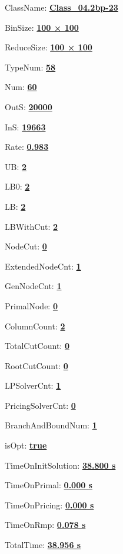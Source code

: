 \documentclass[11pt]{article}
\begin{document}
\pagestyle{empty}


ClassName: \underline{\textbf{Class_04.2bp-23}}
\par
BinSize: \underline{\textbf{100 × 100}}
\par
ReduceSize: \underline{\textbf{100 × 100}}
\par
TypeNum: \underline{\textbf{58}}
\par
Num: \underline{\textbf{60}}
\par
OutS: \underline{\textbf{20000}}
\par
InS: \underline{\textbf{19663}}
\par
Rate: \underline{\textbf{0.983}}
\par
UB: \underline{\textbf{2}}
\par
LB0: \underline{\textbf{2}}
\par
LB: \underline{\textbf{2}}
\par
LBWithCut: \underline{\textbf{2}}
\par
NodeCut: \underline{\textbf{0}}
\par
ExtendedNodeCnt: \underline{\textbf{1}}
\par
GenNodeCnt: \underline{\textbf{1}}
\par
PrimalNode: \underline{\textbf{0}}
\par
ColumnCount: \underline{\textbf{2}}
\par
TotalCutCount: \underline{\textbf{0}}
\par
RootCutCount: \underline{\textbf{0}}
\par
LPSolverCnt: \underline{\textbf{1}}
\par
PricingSolverCnt: \underline{\textbf{0}}
\par
BranchAndBoundNum: \underline{\textbf{1}}
\par
isOpt: \underline{\textbf{true}}
\par
TimeOnInitSolution: \underline{\textbf{38.800 s}}
\par
TimeOnPrimal: \underline{\textbf{0.000 s}}
\par
TimeOnPricing: \underline{\textbf{0.000 s}}
\par
TimeOnRmp: \underline{\textbf{0.078 s}}
\par
TotalTime: \underline{\textbf{38.956 s}}
\par
\newpage
\end{document}
